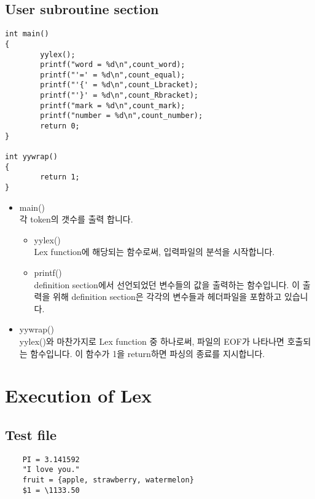 \documentclass{article}
\begin{document}
\subsection{User subroutine section}
\begin{lstlisting}
int main()
{
        yylex();
        printf("word = %d\n",count_word);
        printf("'=' = %d\n",count_equal);
        printf("'{' = %d\n",count_Lbracket);
        printf("'}' = %d\n",count_Rbracket);
        printf("mark = %d\n",count_mark);
        printf("number = %d\n",count_number);
        return 0;
}

int yywrap()
{
        return 1;
}
\end{lstlisting}
\par
\begin{center}
    \begin{itemize}
        \item main() \\ 각 token의 갯수를 출력 합니다.
            \begin{itemize}
                \item yylex() \\ Lex function에 해당되는 함수로써, 입력파일의 분석을 시작합니다.
                \item printf() \\ definition section에서 선언되었던 변수들의 값을 출력하는 함수입니다. 이 출력을 위해 definition section은 각각의 변수들과 헤더파일을 포함하고 있습니다. \\
            \end{itemize}
        \item yywrap() \\ yylex()와 마찬가지로 Lex function 중 하나로써, 파일의 EOF가 나타나면 호출되는 함수입니다. 이 함수가 1을 return하면 파싱의 종료를 지시합니다. \\
    \end{itemize}
\end{center}
\section{Execution of Lex}
\subsection{Test file}
\begin{lstlisting}
    PI = 3.141592
    "I love you."
    fruit = {apple, strawberry, watermelon}
    $1 = \1133.50
\end{lstlisting}
\end{document}

